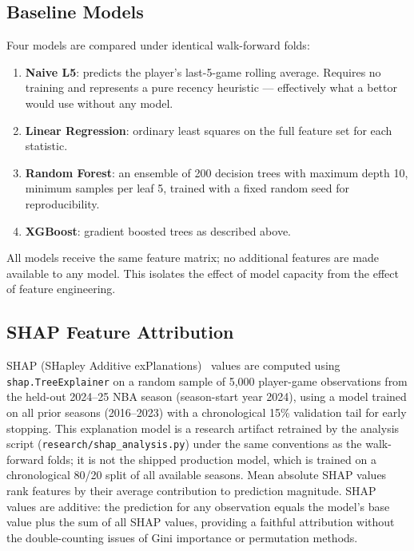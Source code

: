 \documentclass[12pt, letterpaper]{article}
\begin{document}
\subsection{Baseline Models}

Four models are compared under identical walk-forward folds:

\begin{enumerate}
    \item \textbf{Naive L5}: predicts the player's last-5-game rolling
          average. Requires no training and represents a pure recency
          heuristic --- effectively what a bettor would use without any
          model.
    \item \textbf{Linear Regression}: ordinary least squares on the full
          feature set for each statistic.
    \item \textbf{Random Forest}: an ensemble of 200 decision trees with
          maximum depth 10, minimum samples per leaf 5, trained with a
          fixed random seed for reproducibility.
    \item \textbf{XGBoost}: gradient boosted trees as described above.
\end{enumerate}

All models receive the same feature matrix; no additional features are
made available to any model. This isolates the effect of model capacity
from the effect of feature engineering.

\subsection{SHAP Feature Attribution}

SHAP (SHapley Additive exPlanations)~\citep{lundberg2017unified} values
are computed using \texttt{shap.TreeExplainer} on a random sample of
5,000 player-game observations from the held-out 2024--25 NBA season
(season-start year 2024), using a model trained on all prior seasons
(2016--2023) with a chronological 15\% validation tail for early stopping.
This explanation model is a research artifact retrained by the analysis
script (\texttt{research/shap\_analysis.py}) under the same conventions as
the walk-forward folds; it is not the shipped production model, which is
trained on a chronological 80/20 split of all available seasons.
Mean absolute SHAP values rank features by their average contribution
to prediction magnitude.
SHAP values are additive: the prediction for any observation equals the
model's base value plus the sum of all SHAP values, providing a
faithful attribution without the double-counting issues of Gini importance
or permutation methods.
\end{document}
